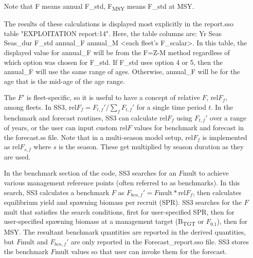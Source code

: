 Note that F means annual F\_std, F\textsubscript{MSY} means F\_std at MSY.

The results of these calculations is displayed most explicitly in the report.sso table "EXPLOITATION report:14".  Here, the table columns are:
Yr Seas Seas_dur F_std annual_F annual_M <each fleet's F_scalar>.
In this table, the displayed value for annual_F will be from the F=Z-M method regardless of which option was chosen for F_std.  If F_std uses option 4 or 5, then the annual_F will use the same range of ages.  Otherwise, annual_F will be for the age that is the mid-age of the age range.



The $F'$ is fleet-specific, so it is useful to have a concept of relative $F$, $\text{rel}F_f$, among fleets. In SS3, $\text{rel}F_f= F_{t,f}'/\sum_{f}^{}F_{t,f}'$ for a single time period $t$. In the benchmark and forecast routines, SS3 can calculate $\text{rel}F_f$ using $F_{t,f}'$ over a range of years, or the user can input custom $\text{rel}F$ values for benchmark and forecast in the forecast.ss file. Note that in a multi-season model setup, $\text{rel}F_f$ is implemented as $\text{rel}F_{s,f}$ where $s$ is the season. These get multiplied by season duration as they are used.

In the benchmark section of the code, SS3 searches for an $F$mult to achieve various management reference points (often referred to as benchmarks). In this search, SS3 calculates a benchmark $F$ as  $F_{ben,f}' = F\text{mult} * \text{rel}F_f$, then calculates equilibrium yield and spawning biomass per recruit (SPR). SS3 searches for the $F$mult that satisfies the search conditions, first for user-specified SPR, then for user-specified spawning biomass at a management target (B\textsubscript{TGT} or $F_{0.1}$), then for MSY. The resultant benchmark quantities are reported in the derived quantities, but $F$mult and $F_{ben,f}'$ are only reported in the Forecast\_report.sso file. SS3 stores the benchmark $F$mult values so that user can invoke them for the forecast.

